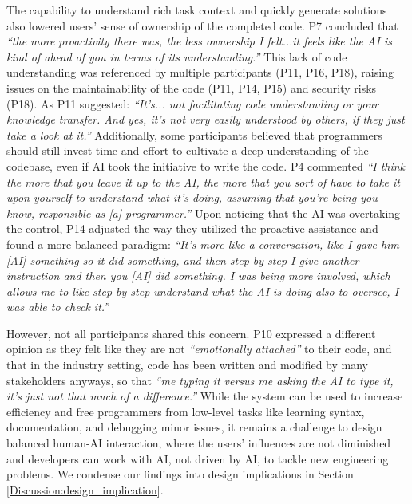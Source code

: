 The capability to understand rich task context and quickly generate solutions also lowered users' sense of ownership of the completed code.
P7 concluded that \textit{``the more proactivity there was, the less ownership I felt...it feels like the AI is kind of ahead of you in terms of its understanding.''}
This lack of code understanding was referenced by multiple participants (P11, P16, P18), raising issues on the maintainability of the code (P11, P14, P15) and security risks (P18).
As P11 suggested: \textit{``It's... not facilitating code understanding or your knowledge transfer. And yes, it's not very easily understood by others, if they just take a look at it.''}
Additionally, some participants believed that programmers should still invest time and effort to cultivate a deep understanding of the codebase, even if AI took the initiative to write the code.
P4 commented \textit{``I think the more that you leave it up to the AI, the more that you sort of have to take it upon yourself to understand what it's doing, assuming that you're being you know, responsible as [a] programmer.''}
Upon noticing that the AI was overtaking the control, P14 adjusted the way they utilized the proactive assistance and found a more balanced paradigm: \textit{``It's more like a conversation, like I gave him [AI] something so it did something, and then step by step I give another instruction and then you [AI] did something. I was being more involved, which allows me to like step by step understand what the AI is doing also to oversee, I was able to check it.''}

However, not all participants shared this concern. P10 expressed a different opinion as they felt like they are not \textit{``emotionally attached''} to their code, and that in the industry setting, code has been written and modified by many stakeholders anyways, so that \textit{``me typing it versus me asking the AI to type it, it's just not that much of a difference.''}
While the system can be used to increase efficiency and free programmers from low-level tasks like learning syntax, documentation, and debugging minor issues, it remains a challenge to design balanced human-AI interaction, where the users' influences are not diminished and developers can work with AI, not driven by AI, to tackle new engineering problems.
We condense our findings into design implications in Section \ref{Discussion:design_implication}.


